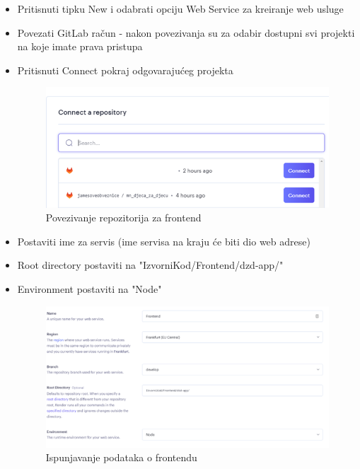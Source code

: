                 \begin{itemize}
                    \item Pritisnuti tipku New i odabrati opciju Web Service za kreiranje web usluge
                    \item Povezati GitLab račun - nakon povezivanja su za odabir dostupni svi projekti na koje imate prava pristupa
                    \item Pritisnuti Connect pokraj odgovarajućeg projekta
                    \begin{figure}[H]
    			\includegraphics[width=\textwidth,height=0.25\textheight]{slike/connectFront.png}
    			\centering
    			\caption{Povezivanje repozitorija za frontend}
    			\label{fig:connectRepoFront}
    			\end{figure}
                    \item Postaviti ime za servis (ime servisa na kraju će biti dio web adrese)
                    \item Root directory postaviti na "IzvorniKod/Frontend/dzd-app/"
                    \item Environment postaviti na "Node"
                    \begin{figure}[H]
    			\includegraphics[scale=0.75]{slike/fillDataDeployFront.png}
    			\centering
    			\caption{Ispunjavanje podataka o frontendu}

\end{figure}
\end{itemize}
